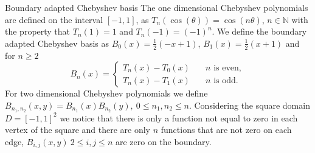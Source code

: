 \documentclass{beamer}
\newcommand{\numberset}{\mathbb}
\newcommand{\N}{\numberset{N}}
\begin{document}
\begin{frame}{Boundary adapted Chebyshev basis}
	The one dimensional Chebyshev polynomials are defined on the interval $ [-1, 1] $, as $T_n(\cos(\theta)) = \cos(n\theta)$, $n \in \N$ with the property that $T_n(1) = 1$ and $T_n(-1) = (-1)^n$. We define the boundary adapted Chebyshev basis as $B_0(x) = \frac12(-x+1)$, $B_1(x) = \frac12(x+1)$ and for $n \ge 2$
	\[ B_n(x) = \begin{cases}
		T_n(x) - T_0(x) \quad & n \text{ is even},\\
		T_n(x) - T_1(x) \quad & n \text{ is odd}.
	\end{cases} \]	
	\pause
	For two dimensional Chebyshev polynomials we define $B_{n_1, n_2}(x, y) = B_{n_1}(x)B_{n_2}(y), \ 0 \le n_1, n_2 \le n$. Considering the square domain $D = [-1, 1]^2$ we notice that there is only a function not equal to zero in each vertex of the square and there are only $n$ functions that are not zero on each edge, $B_{i,j}(x,y) \ 2\le i,j \le n$ are zero on the boundary.
\end{frame}

\end{document}
